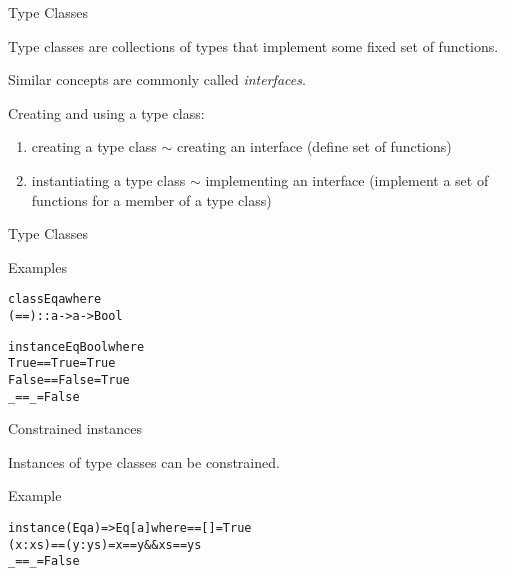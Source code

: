 \documentclass{beamer}
\begin{document}
\begin{frame}{Type Classes}

\begin{block}{\centering Type classes are collections of types that implement some fixed set of functions.}
\end{block}

Similar concepts are commonly called \textit{interfaces}.

\pause

\vspace{1cm}
Creating and using a type class:
\begin{enumerate}
    \item creating a type class $\sim$ creating an interface (define set of functions)
    \item instantiating a type class $\sim$ implementing an interface (implement a set of functions for a member of a type class)
\end{enumerate}

\end{frame}

\begin{frame}[fragile]{Type Classes}

\begin{exampleblock}{Examples}
\begin{alltt}
class Eq a where
  (==) :: a -> a -> Bool\pause

instance Eq Bool where
  True  == True  = True
  False == False = True
  _     == _     = False
\end{alltt}
\end{exampleblock}

\end{frame}

\begin{frame}[fragile]{Constrained instances}

Instances of type classes can be constrained.

\begin{exampleblock}{Example}
\begin{alltt}
instance (Eq a) => Eq [a] where\pause
  [] == [] = True\pause
  (x:xs) == (y:ys) = x == y && xs == ys\pause
  _ == _ = False
\end{alltt}
\end{exampleblock}

\end{frame}
\end{document}
